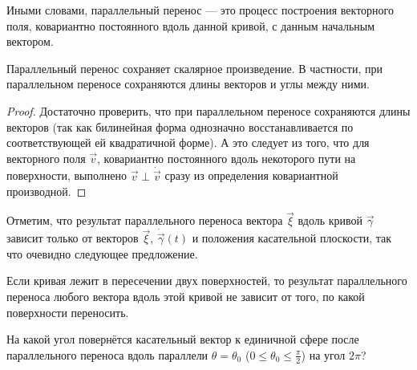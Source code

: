 Иными словами, параллельный перенос --- это процесс построения векторного поля, ковариантно постоянного вдоль данной кривой, с данным начальным вектором.

\begin{lemma}
	Параллельный перенос сохраняет скалярное произведение. В частности, при параллельном переносе сохраняются длины векторов и углы между ними.
\end{lemma}

\begin{proof}
	Достаточно проверить, что при параллельном переносе сохраняются длины векторов (так как билинейная форма однозначно восстанавливается по соответствующей ей квадратичной форме). А это следует из того, что для векторного поля $\vec{v}$, ковариантно постоянного вдоль некоторого пути на поверхности, выполнено $\vec{v} \perp \dot{\vec{v}}$ сразу из определения ковариантной производной.
\end{proof}

Отметим, что результат параллельного переноса вектора $\vec{\xi}$ вдоль кривой $\vec{\gamma}$ зависит только от векторов $\vec{\xi}$, $\dot{\vec{\gamma}}(t)$ и положения касательной плоскости, так что очевидно следующее предложение.

\begin{proposition}
	Если кривая лежит в пересечении двух поверхностей, то результат параллельного переноса любого вектора вдоль этой кривой не зависит от того, по какой поверхности переносить.
\end{proposition}

\begin{problem}
	На какой угол повернётся касательный вектор к единичной сфере после параллельного переноса вдоль параллели $\theta = \theta_0$ ($0 \leqslant \theta_0 \leqslant \frac{\pi}{2}$) на угол $2\pi$?
\end{problem}

